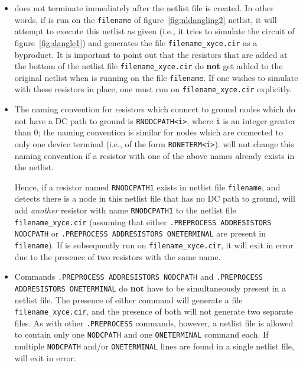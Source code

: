 \begin{itemize}
\item \Xyce{} does not terminate immediately after the netlist file is created.
In other words, if \Xyce{} is run on the \texttt{filename} of figure\ 
\ref{fig:nldangling2} netlist, it will attempt to execute this netlist as given 
(i.e., it tries to simulate the circuit of figure\ \ref{fig:dangle1}) and 
generates the file \texttt{filename\_xyce.cir} as a byproduct.  It is important to
point out that the resistors that are added at the bottom of the netlist 
file \texttt{filename\_xyce.cir} do {\bf not} get added to the original netlist
when \Xyce{} is running on the file \texttt{filename}.  If one wishes to simulate
\Xyce{} with these resistors in place, one must run \Xyce{} on 
\texttt{filename\_xyce.cir} explicitly.

\item The naming convention for resistors which connect to ground nodes which 
do not have a DC path to ground is \texttt{RNODCPATH<i>}, where \texttt{i} is an 
integer greater than 0; the naming convention is similar for nodes which are 
connected to only one device terminal (i.e., of the form \texttt{RONETERM<i>}).   
\Xyce{} will not change this naming convention if a 
resistor with one of the above names already exists in the netlist.  

Hence, if a resistor named \texttt{RNODCPATH1} exists in netlist file 
\texttt{filename}, and \Xyce{} detects there is a node in this netlist file 
that has no DC path to ground, \Xyce{} will add {\em another} resistor with name 
\texttt{RNODCPATH1} to the netlist file \texttt{filename\_xyce.cir} (assuming that 
either \texttt{.PREPROCESS ADDRESISTORS NODCPATH} or \texttt{.PREPROCESS ADDRESISTORS
ONETERMINAL} are present in \texttt{filename}).  If \Xyce{} is subsequently run on 
\texttt{filename\_xyce.cir}, it will exit in error due to the presence of two 
resistors with the same name.

\item Commands \texttt{.PREPROCESS ADDRESISTORS NODCPATH}  and 
\texttt{.PREPROCESS} \newline \texttt{ADDRESISTORS ONETERMINAL} do {\bf not} have to be 
simultaneously present in a netlist file.  The presence of either command will
generate a file \texttt{filename\_xyce.cir}, and the presence of both will not
generate two separate files.  As with other \texttt{.PREPROCESS} commands, 
however, a netlist file is allowed to contain only one \texttt{NODCPATH} and
one \texttt{ONETERMINAL} command each.  If multiple \texttt{NODCPATH} and/or 
\texttt{ONETERMINAL} lines are found in a single netlist file, \Xyce{} will exit in
error.


\end{itemize}
